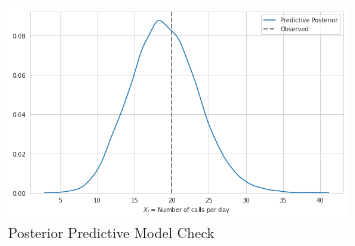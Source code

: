 \documentclass[11pt, letterpaper]{article}
\begin{document}
\begin{figure}[!h]
  \centering
  \includegraphics[width=0.8\textwidth]{5.b.png}
  \captionsetup{justification=centering}
  \caption{Posterior Predictive Model Check}
\end{figure}
\newpage
\end{document}
